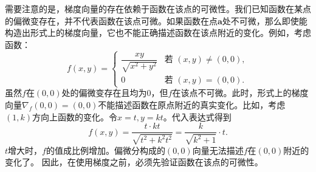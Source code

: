 \documentclass[12pt,UTF8]{ctexbook}
\begin{document}

需要注意的是，梯度向量的存在依赖于函数在该点的可微性。我们已知函数在某点的偏微变存在，并不代表函数在该点可微。如果函数在点$\mathbf{a}$处不可微，那么即使能构造出形式上的梯度向量，它也不能正确描述函数在该点附近的变化。例如，考虑函数：
$$ f(x,y) = \begin{cases}
\dfrac{xy}{\sqrt{x^2+y^2}} & \text{若 } (x,y) \neq (0,0), \\
0 & \text{若 } (x,y) = (0,0).
\end{cases} $$
虽然$f$在$(0,0)$处的偏微变存在且均为$0$，但$f$在该点不可微。此时，形式上的梯度向量$\nabla_f(0,0) = (0,0)$不能描述函数在原点附近的真实变化。比如，考虑$(1,k)$方向上函数的变化。令$x = t, y = kt$。代入表达式得到
$$ f(x, y) = \frac{t\cdot kt}{\sqrt{t^2 + k^2t^2}} = \frac{k}{\sqrt{k^2 + 1}}\cdot t.$$
$t$增大时，$f$的值成比例增加。偏微分构成的$(0,0)$向量无法描述$f$在$(0,0)$附近的变化了。
因此，在使用梯度之前，必须先验证函数在该点的可微性。
\end{document}
